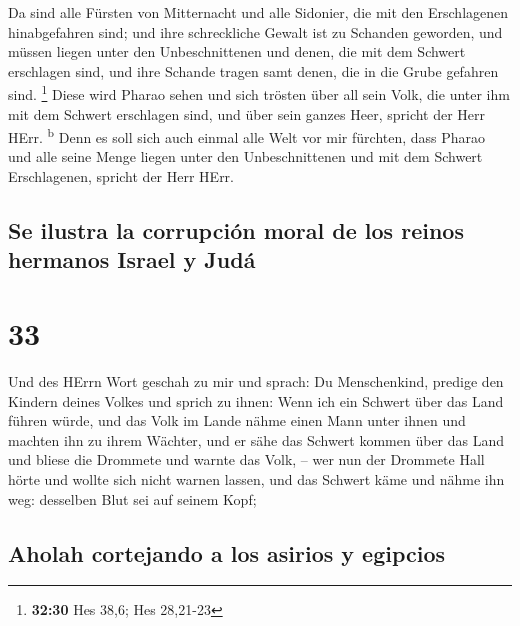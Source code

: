  Da sind alle Fürsten von Mitternacht und alle Sidonier,
die mit den Erschlagenen hinabgefahren sind; und ihre schreckliche
Gewalt ist zu Schanden geworden, und müssen liegen unter den
Unbeschnittenen und denen, die mit dem Schwert erschlagen sind, und ihre
Schande tragen samt denen, die in die Grube gefahren sind. \footnote{\textbf{32:30}
  Hes 38,6; Hes 28,21-23}  Diese wird Pharao sehen und
sich trösten über all sein Volk, die unter ihm mit dem Schwert
erschlagen sind, und über sein ganzes Heer, spricht der Herr HErr.
\textsuperscript{b}  Denn es soll sich auch einmal alle
Welt vor mir fürchten, dass Pharao und alle seine Menge liegen unter den
Unbeschnittenen und mit dem Schwert Erschlagenen, spricht der Herr HErr.

\hypertarget{se-ilustra-la-corrupciuxf3n-moral-de-los-reinos-hermanos-israel-y-juduxe1}{%
\subsection{Se ilustra la corrupción moral de los reinos hermanos Israel
y
Judá}\label{se-ilustra-la-corrupciuxf3n-moral-de-los-reinos-hermanos-israel-y-juduxe1}}

\hypertarget{section-32}{%
\section{33}\label{section-32}}

 Und des HErrn Wort geschah zu mir und sprach:
 Du Menschenkind, predige den Kindern deines Volkes und
sprich zu ihnen: Wenn ich ein Schwert über das Land führen würde, und
das Volk im Lande nähme einen Mann unter ihnen und machten ihn zu ihrem
Wächter,  und er sähe das Schwert kommen über das Land und
bliese die Drommete und warnte das Volk, --  wer nun der
Drommete Hall hörte und wollte sich nicht warnen lassen, und das Schwert
käme und nähme ihn weg: desselben Blut sei auf seinem Kopf;

\hypertarget{aholah-cortejando-a-los-asirios-y-egipcios}{%
\subsection{Aholah cortejando a los asirios y
egipcios}\label{aholah-cortejando-a-los-asirios-y-egipcios}}


